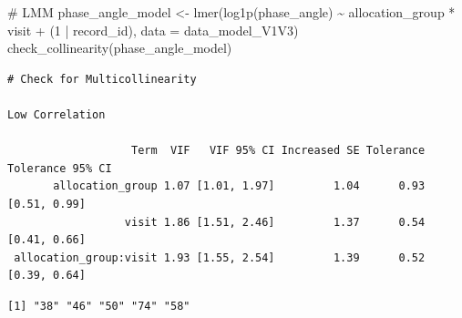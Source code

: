 \documentclass[
  12pt,
]{article}
\newenvironment{Shaded}{\begin{snugshade}}{\end{snugshade}}
\newcommand{\AttributeTok}[1]{\textcolor[rgb]{0.40,0.45,0.13}{#1}}
\newcommand{\CommentTok}[1]{\textcolor[rgb]{0.37,0.37,0.37}{#1}}
\newcommand{\DecValTok}[1]{\textcolor[rgb]{0.68,0.00,0.00}{#1}}
\newcommand{\FunctionTok}[1]{\textcolor[rgb]{0.28,0.35,0.67}{#1}}
\newcommand{\NormalTok}[1]{\textcolor[rgb]{0.00,0.23,0.31}{#1}}
\newcommand{\OtherTok}[1]{\textcolor[rgb]{0.00,0.23,0.31}{#1}}
\newcommand{\SpecialCharTok}[1]{\textcolor[rgb]{0.37,0.37,0.37}{#1}}
\newcommand{\StringTok}[1]{\textcolor[rgb]{0.13,0.47,0.30}{#1}}
\begin{document}
\begin{Shaded}
\begin{Highlighting}[]
\CommentTok{\# LMM}
\NormalTok{phase\_angle\_model }\OtherTok{\textless{}{-}} \FunctionTok{lmer}\NormalTok{(}\FunctionTok{log1p}\NormalTok{(phase\_angle) }\SpecialCharTok{\textasciitilde{}}\NormalTok{ allocation\_group }\SpecialCharTok{*}\NormalTok{ visit }\SpecialCharTok{+} 
\NormalTok{(}\DecValTok{1} \SpecialCharTok{|}\NormalTok{ record\_id), }\AttributeTok{data =}\NormalTok{ data\_model\_V1V3)}
\FunctionTok{check\_collinearity}\NormalTok{(phase\_angle\_model)}
\end{Highlighting}
\end{Shaded}

\begin{verbatim}
# Check for Multicollinearity

Low Correlation

                   Term  VIF   VIF 95% CI Increased SE Tolerance Tolerance 95% CI
       allocation_group 1.07 [1.01, 1.97]         1.04      0.93     [0.51, 0.99]
                  visit 1.86 [1.51, 2.46]         1.37      0.54     [0.41, 0.66]
 allocation_group:visit 1.93 [1.55, 2.54]         1.39      0.52     [0.39, 0.64]
\end{verbatim}

\begin{Shaded}
\end{Shaded}

\begin{verbatim}
[1] "38" "46" "50" "74" "58"
\end{verbatim}
\end{document}
